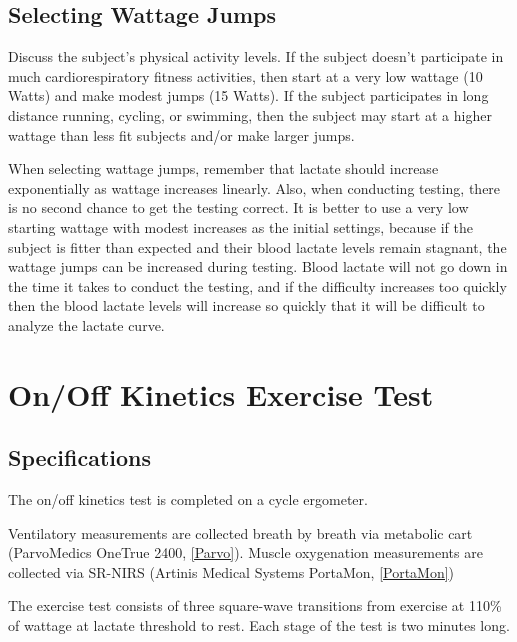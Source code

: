 \documentclass[
]{book}
\begin{document}
\hypertarget{ExerciseTesting-LT-Watts}{%
\subsection{Selecting Wattage Jumps}\label{ExerciseTesting-LT-Watts}}

Discuss the subject's physical activity levels. If the subject doesn't participate in much cardiorespiratory fitness activities, then start at a very low wattage (10 Watts) and make modest jumps (15 Watts). If the subject participates in long distance running, cycling, or swimming, then the subject may start at a higher wattage than less fit subjects and/or make larger jumps.

When selecting wattage jumps, remember that lactate should increase exponentially as wattage increases linearly. Also, when conducting testing, there is no second chance to get the testing correct. It is better to use a very low starting wattage with modest increases as the initial settings, because if the subject is fitter than expected and their blood lactate levels remain stagnant, the wattage jumps can be increased during testing. Blood lactate will not go down in the time it takes to conduct the testing, and if the difficulty increases too quickly then the blood lactate levels will increase so quickly that it will be difficult to analyze the lactate curve.

\hypertarget{ExerciseTesting-Onoff}{%
\section{On/Off Kinetics Exercise Test}\label{ExerciseTesting-Onoff}}

\hypertarget{ExerciseTesting-Onoff-Specs}{%
\subsection{Specifications}\label{ExerciseTesting-Onoff-Specs}}

The on/off kinetics test is completed on a cycle ergometer.

Ventilatory measurements are collected breath by breath via metabolic cart (ParvoMedics OneTrue 2400, \ref{Parvo}). Muscle oxygenation measurements are collected via SR-NIRS (Artinis Medical Systems PortaMon, \ref{PortaMon})

The exercise test consists of three square-wave transitions from exercise at 110\% of wattage at lactate threshold to rest. Each stage of the test is two minutes long.
\end{document}

